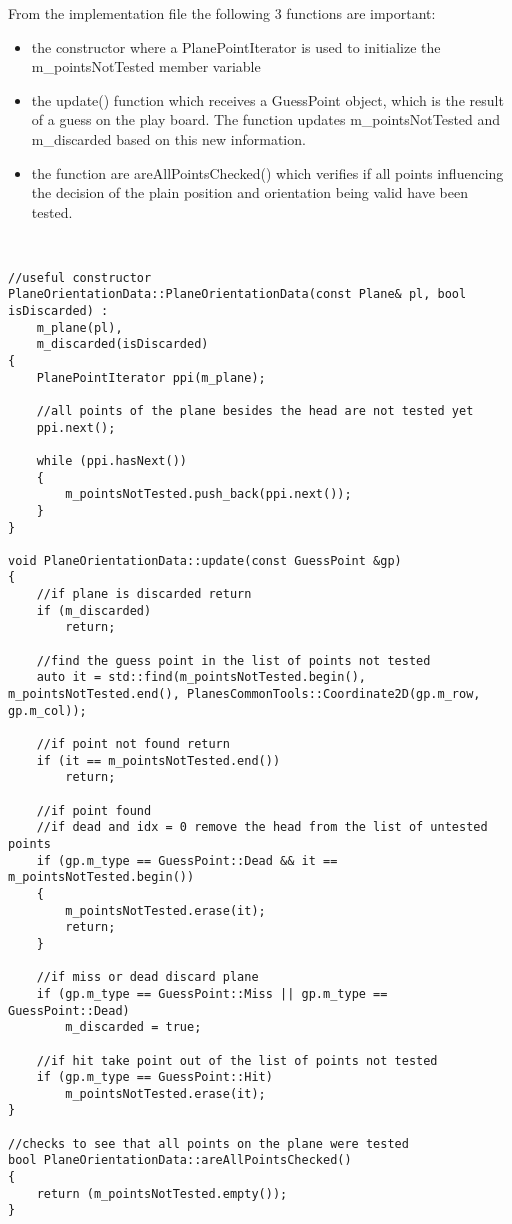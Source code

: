From the implementation file the following 3 functions are important: \begin{itemize}
	\item the constructor where a PlanePointIterator is used to initialize the m\_pointsNotTested member variable
	\item the update() function which receives a GuessPoint object, which is the result of a guess on the play board. The function updates m\_pointsNotTested and m\_discarded based on this new information.
	\item the function are areAllPointsChecked() which verifies if all points influencing the decision of the plain position and orientation being valid have been tested.
\end{itemize}

\begin{lstlisting}


//useful constructor
PlaneOrientationData::PlaneOrientationData(const Plane& pl, bool isDiscarded) :
	m_plane(pl),
	m_discarded(isDiscarded)
{
	PlanePointIterator ppi(m_plane);
	
	//all points of the plane besides the head are not tested yet
	ppi.next();

	while (ppi.hasNext())
	{
		m_pointsNotTested.push_back(ppi.next());
	}
}

void PlaneOrientationData::update(const GuessPoint &gp)
{
	//if plane is discarded return
	if (m_discarded)
		return;
	
	//find the guess point in the list of points not tested
	auto it = std::find(m_pointsNotTested.begin(), m_pointsNotTested.end(), PlanesCommonTools::Coordinate2D(gp.m_row, gp.m_col));
	
	//if point not found return
	if (it == m_pointsNotTested.end())
		return;
	
	//if point found
	//if dead and idx = 0 remove the head from the list of untested points
	if (gp.m_type == GuessPoint::Dead && it == m_pointsNotTested.begin())
	{
		m_pointsNotTested.erase(it);
		return;
	}
	
	//if miss or dead discard plane
	if (gp.m_type == GuessPoint::Miss || gp.m_type == GuessPoint::Dead)
		m_discarded = true;
	
	//if hit take point out of the list of points not tested
	if (gp.m_type == GuessPoint::Hit)
		m_pointsNotTested.erase(it);
}

//checks to see that all points on the plane were tested
bool PlaneOrientationData::areAllPointsChecked()
{
	return (m_pointsNotTested.empty());
}

\end{lstlisting}

